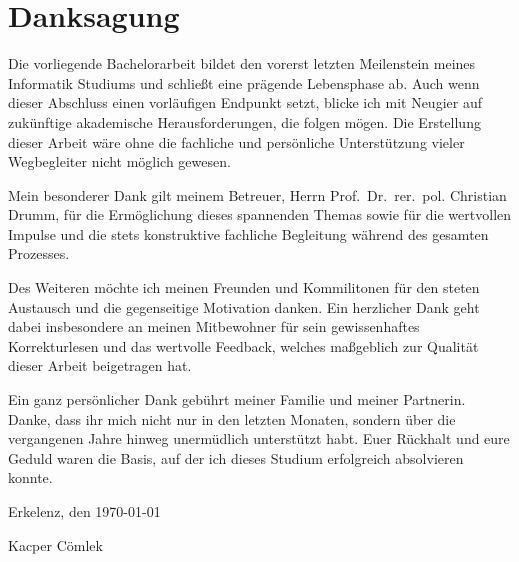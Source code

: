 \clearpage
\chapter*{\textbf{Danksagung}}\label{acknowledgements}

Die vorliegende Bachelorarbeit bildet den vorerst letzten Meilenstein meines Informatik Studiums und schließt eine prägende Lebensphase ab. Auch wenn dieser Abschluss einen vorläufigen Endpunkt setzt, blicke ich mit Neugier auf zukünftige akademische Herausforderungen, die folgen mögen. Die Erstellung dieser Arbeit wäre ohne die fachliche und persönliche Unterstützung vieler Wegbegleiter nicht möglich gewesen.

Mein besonderer Dank gilt meinem Betreuer, Herrn Prof.~Dr.~rer.~pol. Christian Drumm, für die Ermöglichung dieses spannenden Themas sowie für die wertvollen Impulse und die stets konstruktive fachliche Begleitung während des gesamten Prozesses.

Des Weiteren möchte ich meinen Freunden und Kommilitonen für den steten Austausch und die gegenseitige Motivation danken. Ein herzlicher Dank geht dabei insbesondere an meinen Mitbewohner für sein gewissenhaftes Korrekturlesen und das wertvolle Feedback, welches maßgeblich zur Qualität dieser Arbeit beigetragen hat.

Ein ganz persönlicher Dank gebührt meiner Familie und meiner Partnerin. Danke, dass ihr mich nicht nur in den letzten Monaten, sondern über die vergangenen Jahre hinweg unermüdlich unterstützt habt. Euer Rückhalt und eure Geduld waren die Basis, auf der ich dieses Studium erfolgreich absolvieren konnte.

\vspace{2cm}

\noindent
Erkelenz, den \today

\vspace{1.5cm}

\noindent
Kacper Cömlek

